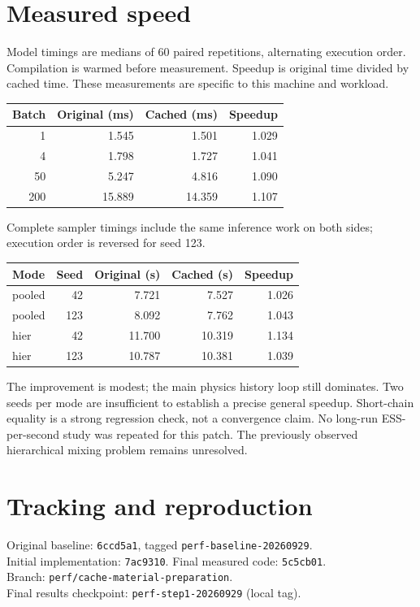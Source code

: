 \documentclass[11pt]{article}
\begin{document}
\section*{Measured speed}
Model timings are medians of 60 paired repetitions, alternating execution order.
Compilation is warmed before measurement. Speedup is original time divided by
cached time. These measurements are specific to this machine and workload.
\begin{center}\begin{tabular}{rrrr}\toprule
Batch & Original (ms) & Cached (ms) & Speedup\\\midrule
1 & 1.545 & 1.501 & 1.029\\
4 & 1.798 & 1.727 & 1.041\\
50 & 5.247 & 4.816 & 1.090\\
200 & 15.889 & 14.359 & 1.107\\
\bottomrule\end{tabular}\end{center}
Complete sampler timings include the same inference work on both sides; execution
order is reversed for seed 123.
\begin{center}\begin{tabular}{lrrrr}\toprule
Mode & Seed & Original (s) & Cached (s) & Speedup\\\midrule
pooled & 42 & 7.721 & 7.527 & 1.026\\
pooled & 123 & 8.092 & 7.762 & 1.043\\
hier & 42 & 11.700 & 10.319 & 1.134\\
hier & 123 & 10.787 & 10.381 & 1.039\\
\bottomrule\end{tabular}\end{center}
The improvement is modest; the main physics history loop still dominates.
Two seeds per mode are insufficient to establish a precise general speedup.
Short-chain equality is a strong regression check, not a convergence claim.
No long-run ESS-per-second study was repeated for this patch. The previously
observed hierarchical mixing problem remains unresolved.
\section*{Tracking and reproduction}
Original baseline: \texttt{6ccd5a1}, tagged \texttt{perf-baseline-20260929}.\\
Initial implementation: \texttt{7ac9310}. Final measured code: \texttt{5c5cb01}.\\
Branch: \texttt{perf/cache-material-preparation}.\\
Final results checkpoint: \texttt{perf-step1-20260929} (local tag).
\end{document}
